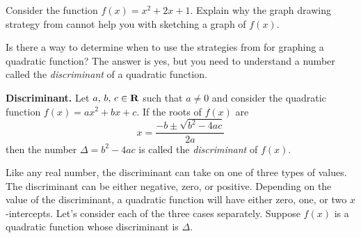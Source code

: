 \documentclass[a4paper,oneside,12pt]{article}
\begin{document}
\begin{exercise}
Consider the function $f(x) = x^2 + 2x + 1$.  Explain why the graph
drawing strategy from  cannot help you
with sketching a graph of $f(x)$.
\end{exercise}

Is there a way to determine when to use the strategies
from  for graphing a
quadratic function?  The answer is yes, but you need to understand a
number called the \emph{discriminant} of a quadratic function.

\begin{definition}
\label{def:discriminant}
\textbf{Discriminant.}
Let ${a},\, {b},\, {c} \in \mathbf{R}$ such that $a \neq 0$ and consider the
quadratic function $f(x) = ax^2 + bx + c$.  If the roots of $f(x)$ are
\[
x
=
\frac{
  -b \pm \sqrt{b^2 - 4ac}
}{
  2a
}
\]
then the number $\Delta = b^2 - 4ac$ is called the \emph{discriminant}
of $f(x)$.
\end{definition}

Like any real number, the discriminant can take on one of three types
of values.  The discriminant can be either negative, zero, or
positive.  Depending on the value of the discriminant, a quadratic
function will have either zero, one, or two $x$-intercepts.  Let's
consider each of the three cases separately.  Suppose $f(x)$ is a
quadratic function whose discriminant is $\Delta$.
\end{document}
